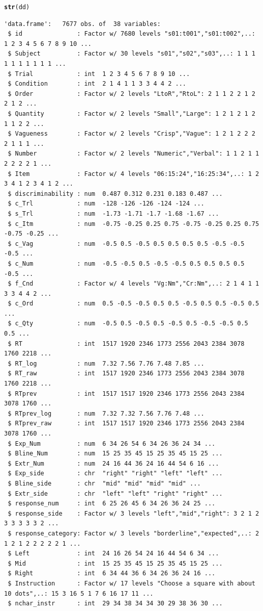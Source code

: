 \documentclass[a4paper,12pt]{article}\usepackage[]{graphicx}\usepackage[]{color}
\makeatletter
\newcommand{\hlstd}[1]{\textcolor[rgb]{0.345,0.345,0.345}{#1}}%
\newcommand{\hlkwd}[1]{\textcolor[rgb]{0.737,0.353,0.396}{\textbf{#1}}}%
\newenvironment{kframe}{%
 \def\at@end@of@kframe{}%
 \ifinner\ifhmode%
  \def\at@end@of@kframe{\end{minipage}}%
  \begin{minipage}{\columnwidth}%
 \fi\fi%
 \def\FrameCommand##1{\hskip\@totalleftmargin \hskip-\fboxsep
 \colorbox{shadecolor}{##1}\hskip-\fboxsep
     \hskip-\linewidth \hskip-\@totalleftmargin \hskip\columnwidth}%
 \MakeFramed {\advance\hsize-\width
   \@totalleftmargin\z@ \linewidth\hsize
   \@setminipage}}%
 {\par\unskip\endMakeFramed%
 \at@end@of@kframe}
\newenvironment{knitrout}{}{} %
\makeatother
\begin{document}
\begin{knitrout}\scriptsize
{}\color{fgcolor}\begin{kframe}
\begin{alltt}
\hlkwd{str}\hlstd{(dd)}
\end{alltt}
\begin{verbatim}
'data.frame':	7677 obs. of  38 variables:
 $ id               : Factor w/ 7680 levels "s01:t001","s01:t002",..: 1 2 3 4 5 6 7 8 9 10 ...
 $ Subject          : Factor w/ 30 levels "s01","s02","s03",..: 1 1 1 1 1 1 1 1 1 1 ...
 $ Trial            : int  1 2 3 4 5 6 7 8 9 10 ...
 $ Condition        : int  2 1 4 1 1 3 3 4 4 2 ...
 $ Order            : Factor w/ 2 levels "LtoR","RtoL": 2 1 1 2 2 1 2 2 1 2 ...
 $ Quantity         : Factor w/ 2 levels "Small","Large": 1 2 1 2 1 2 1 1 2 2 ...
 $ Vagueness        : Factor w/ 2 levels "Crisp","Vague": 1 2 1 2 2 2 2 1 1 1 ...
 $ Number           : Factor w/ 2 levels "Numeric","Verbal": 1 1 2 1 1 2 2 2 2 1 ...
 $ Item             : Factor w/ 4 levels "06:15:24","16:25:34",..: 1 2 3 4 1 2 3 4 1 2 ...
 $ discriminability : num  0.487 0.312 0.231 0.183 0.487 ...
 $ c_Trl            : num  -128 -126 -126 -124 -124 ...
 $ s_Trl            : num  -1.73 -1.71 -1.7 -1.68 -1.67 ...
 $ c_Itm            : num  -0.75 -0.25 0.25 0.75 -0.75 -0.25 0.25 0.75 -0.75 -0.25 ...
 $ c_Vag            : num  -0.5 0.5 -0.5 0.5 0.5 0.5 0.5 -0.5 -0.5 -0.5 ...
 $ c_Num            : num  -0.5 -0.5 0.5 -0.5 -0.5 0.5 0.5 0.5 0.5 -0.5 ...
 $ f_Cnd            : Factor w/ 4 levels "Vg:Nm","Cr:Nm",..: 2 1 4 1 1 3 3 4 4 2 ...
 $ c_Ord            : num  0.5 -0.5 -0.5 0.5 0.5 -0.5 0.5 0.5 -0.5 0.5 ...
 $ c_Qty            : num  -0.5 0.5 -0.5 0.5 -0.5 0.5 -0.5 -0.5 0.5 0.5 ...
 $ RT               : int  1517 1920 2346 1773 2556 2043 2384 3078 1760 2218 ...
 $ RT_log           : num  7.32 7.56 7.76 7.48 7.85 ...
 $ RT_raw           : int  1517 1920 2346 1773 2556 2043 2384 3078 1760 2218 ...
 $ RTprev           : int  1517 1517 1920 2346 1773 2556 2043 2384 3078 1760 ...
 $ RTprev_log       : num  7.32 7.32 7.56 7.76 7.48 ...
 $ RTprev_raw       : int  1517 1517 1920 2346 1773 2556 2043 2384 3078 1760 ...
 $ Exp_Num          : num  6 34 26 54 6 34 26 36 24 34 ...
 $ Bline_Num        : num  15 25 35 45 15 25 35 45 15 25 ...
 $ Extr_Num         : num  24 16 44 36 24 16 44 54 6 16 ...
 $ Exp_side         : chr  "right" "right" "left" "left" ...
 $ Bline_side       : chr  "mid" "mid" "mid" "mid" ...
 $ Extr_side        : chr  "left" "left" "right" "right" ...
 $ response_num     : int  6 25 26 45 6 34 26 36 24 25 ...
 $ response_side    : Factor w/ 3 levels "left","mid","right": 3 2 1 2 3 3 3 3 3 2 ...
 $ response_category: Factor w/ 3 levels "borderline","expected",..: 2 1 2 1 2 2 2 2 2 1 ...
 $ Left             : int  24 16 26 54 24 16 44 54 6 34 ...
 $ Mid              : int  15 25 35 45 15 25 35 45 15 25 ...
 $ Right            : int  6 34 44 36 6 34 26 36 24 16 ...
 $ Instruction      : Factor w/ 17 levels "Choose a square with about 10 dots",..: 15 3 16 5 1 7 6 16 17 11 ...
 $ nchar_instr      : int  29 34 38 34 34 30 29 38 36 30 ...
\end{verbatim}
\end{kframe}
\end{knitrout}
\end{document}
